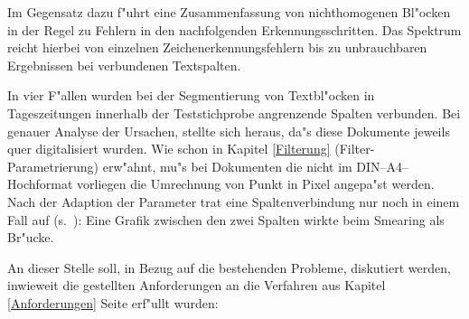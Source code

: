 Im Gegensatz dazu f"uhrt eine Zusammenfassung von nichthomogenen Bl"ocken in der Regel
zu Fehlern in den nachfolgenden Erkennungsschritten.
Das Spektrum reicht hierbei von einzelnen Zeichenerkennungsfehlern bis zu
unbrauchbaren Ergebnissen bei verbundenen Textspalten.

  In vier F"allen wurden bei der Segmentierung von Textbl"ocken in Tageszeitungen
  innerhalb der Teststichprobe 
  angrenzende Spalten verbunden. Bei genauer Analyse der Ursachen, stellte sich heraus, da"s diese
  Dokumente jeweils quer digitalisiert wurden. Wie schon in Kapitel \ref{Filterung}
  (Filter-Parametrierung) erw"ahnt, mu"s bei Dokumenten die nicht im DIN--A4--Hochformat 
  vorliegen die Umrechnung von Punkt in Pixel angepa"st werden. Nach der
  Adaption der Parameter trat eine Spaltenverbindung nur noch in einem
  Fall auf (s.\ ): Eine Grafik zwischen den zwei Spalten wirkte beim
  Smearing als Br"ucke. 

\newpage
An dieser Stelle soll, in Bezug auf die bestehenden Probleme, diskutiert werden, inwieweit die
gestellten Anforderungen an die Verfahren aus Kapitel \ref{Anforderungen} Seite
\pageref{Anforderungen} erf"ullt wurden:

